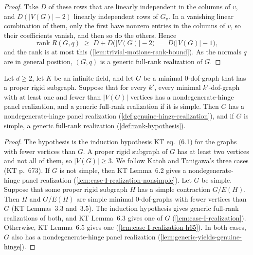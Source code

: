 \begin{proof}
  Take $D$ of these rows that are linearly independent in the columns of
  $v$, and $D(|V(G)| - 2)$ linearly independent rows of $G_v$. In a
  vanishing linear combination of them, only the first have nonzero
  entries in the columns of $v$, so their coefficients vanish, and then
  so do the others. Hence
  \[
    \operatorname{rank} R(G, q) \;\ge\; D + D\bigl(|V(G)| - 2\bigr)
    \;=\; D\bigl(|V(G)| - 1\bigr),
  \]
  and the rank is at most this (\cref{lem:trivial-motions-rank-bound}).
  As the normals $q$ are in general position, $(G, q)$ is a generic
  full-rank realization of $G$.
\end{proof}

\begin{lemma}
  \label{lem:case-I-dispatch}
  \leanok
  Let $d \ge 2$, let $K$ be an infinite field, and let $G$ be a minimal
  $0$-dof-graph that has a proper rigid subgraph. Suppose that for every
  $k'$, every minimal $k'$-dof-graph with at least one and fewer than
  $|V(G)|$ vertices has a nondegenerate-hinge panel realization, and a
  generic full-rank realization if it is simple. Then $G$ has a
  nondegenerate-hinge panel realization
  (\cref{def:genuine-hinge-realization}), and if $G$ is simple, a
  generic full-rank realization (\cref{def:rank-hypothesis}).
\end{lemma}
\begin{proof}
  \leanok
  The hypothesis is the induction hypothesis KT eq.~(6.1) for the graphs
  with fewer vertices than $G$. A proper rigid subgraph of $G$ has at
  least two vertices and not all of them, so $|V(G)| \ge 3$. We follow
  Katoh and Tanigawa's three cases (KT p.~673). If $G$ is not simple,
  then KT Lemma~6.2 gives a nondegenerate-hinge panel
  realization (\cref{lem:case-I-realization-nonsimple}). Let $G$ be
  simple. Suppose that some proper rigid subgraph $H$ has a simple
  contraction $G/E(H)$. Then $H$ and $G/E(H)$ are simple minimal
  $0$-dof-graphs with fewer vertices than $G$ (KT Lemmas~3.3 and~3.5).
  The induction hypothesis gives generic full-rank realizations of both,
  and KT Lemma~6.3 gives one of $G$ (\cref{lem:case-I-realization}).
  Otherwise, KT Lemma~6.5 gives one (\cref{lem:case-I-realization-h65}).
  In both cases, $G$ also has a nondegenerate-hinge panel realization
  (\cref{lem:generic-yields-genuine-hinge}).
\end{proof}

